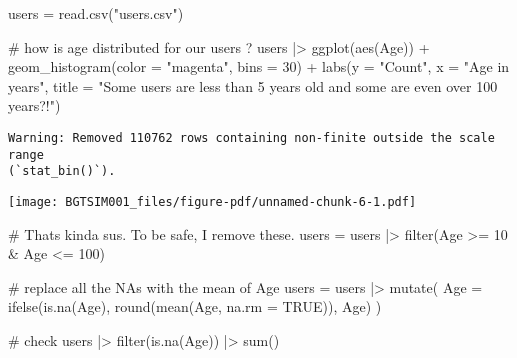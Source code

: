 \documentclass[
]{report}
\newenvironment{Shaded}{\begin{snugshade}}{\end{snugshade}}
\newcommand{\AttributeTok}[1]{\textcolor[rgb]{0.40,0.45,0.13}{#1}}
\newcommand{\CommentTok}[1]{\textcolor[rgb]{0.37,0.37,0.37}{#1}}
\newcommand{\ConstantTok}[1]{\textcolor[rgb]{0.56,0.35,0.01}{#1}}
\newcommand{\DecValTok}[1]{\textcolor[rgb]{0.68,0.00,0.00}{#1}}
\newcommand{\FunctionTok}[1]{\textcolor[rgb]{0.28,0.35,0.67}{#1}}
\newcommand{\NormalTok}[1]{\textcolor[rgb]{0.00,0.23,0.31}{#1}}
\newcommand{\OtherTok}[1]{\textcolor[rgb]{0.00,0.23,0.31}{#1}}
\newcommand{\SpecialCharTok}[1]{\textcolor[rgb]{0.37,0.37,0.37}{#1}}
\newcommand{\StringTok}[1]{\textcolor[rgb]{0.13,0.47,0.30}{#1}}
\begin{document}
\begin{Shaded}
\begin{Highlighting}[]
\NormalTok{users }\OtherTok{=} \FunctionTok{read.csv}\NormalTok{(}\StringTok{"users.csv"}\NormalTok{)}

\CommentTok{\# how is age distributed for our users ?}
\NormalTok{users }\SpecialCharTok{|\textgreater{}} \FunctionTok{ggplot}\NormalTok{(}\FunctionTok{aes}\NormalTok{(Age)) }\SpecialCharTok{+} 
  \FunctionTok{geom\_histogram}\NormalTok{(}\AttributeTok{color =} \StringTok{"magenta"}\NormalTok{, }\AttributeTok{bins =} \DecValTok{30}\NormalTok{) }\SpecialCharTok{+}
  \FunctionTok{labs}\NormalTok{(}\AttributeTok{y =} \StringTok{"Count"}\NormalTok{, }
       \AttributeTok{x =} \StringTok{"Age in years"}\NormalTok{, }
       \AttributeTok{title =} \StringTok{"Some users are less than 5 years old and some are even over 100 years?!"}\NormalTok{)}
\end{Highlighting}
\end{Shaded}

\begin{verbatim}
Warning: Removed 110762 rows containing non-finite outside the scale range
(`stat_bin()`).
\end{verbatim}

\texttt{[image: BGTSIM001\_files/figure-pdf/unnamed-chunk-6-1.pdf]}

\begin{Shaded}
\begin{Highlighting}[]
\CommentTok{\# That\textquotesingle{}s kinda sus. To be safe, I remove these. }
\NormalTok{users }\OtherTok{=}\NormalTok{ users }\SpecialCharTok{|\textgreater{}} 
                 \FunctionTok{filter}\NormalTok{(Age }\SpecialCharTok{\textgreater{}=} \DecValTok{10} \SpecialCharTok{\&}\NormalTok{ Age }\SpecialCharTok{\textless{}=} \DecValTok{100}\NormalTok{)}

\CommentTok{\# replace all the NAs with the mean of Age }
\NormalTok{users }\OtherTok{=}\NormalTok{ users }\SpecialCharTok{|\textgreater{}} \FunctionTok{mutate}\NormalTok{(}
                  \AttributeTok{Age =} \FunctionTok{ifelse}\NormalTok{(}\FunctionTok{is.na}\NormalTok{(Age), }
                               \FunctionTok{round}\NormalTok{(}\FunctionTok{mean}\NormalTok{(Age, }\AttributeTok{na.rm =} \ConstantTok{TRUE}\NormalTok{)), }
\NormalTok{                               Age)}
\NormalTok{)}

\CommentTok{\# check }
\NormalTok{users }\SpecialCharTok{|\textgreater{}} \FunctionTok{filter}\NormalTok{(}\FunctionTok{is.na}\NormalTok{(Age)) }\SpecialCharTok{|\textgreater{}} \FunctionTok{sum}\NormalTok{()}
\end{Highlighting}
\end{Shaded}
\end{document}
